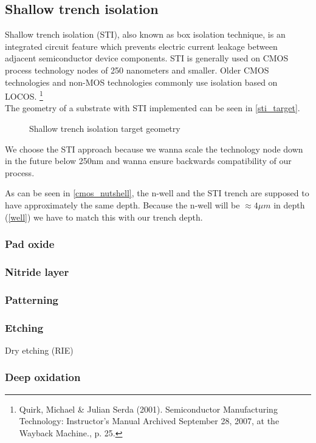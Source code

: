 \subsection{Shallow trench isolation}\label{sti}
Shallow trench isolation (STI), also known as box isolation technique, is an integrated circuit feature which prevents electric current leakage between adjacent semiconductor device components.
STI is generally used on CMOS process technology nodes of 250 nanometers and smaller.
Older CMOS technologies and non-MOS technologies commonly use isolation based on LOCOS.
\footnote{Quirk, Michael \& Julian Serda (2001). Semiconductor Manufacturing Technology: Instructor's Manual Archived September 28, 2007, at the Wayback Machine., p. 25.} \\
The geometry of a substrate with STI implemented can be seen in \autoref{sti_target}.

\begin{figure}[H]
	\centering
	\begin{tikzpicture}[node distance = 3cm, auto, thick,scale=\CrossAndTopSectionBig, every node/.style={transform shape}]
		
	\end{tikzpicture}
	\begin{tikzpicture}[node distance = 3cm, auto, thick,scale=\CrossAndTopSectionBig, every node/.style={transform shape}]
		
	\end{tikzpicture}
	\caption{Shallow trench isolation target geometry}
	\label{sti_target}
\end{figure}

We choose the STI approach because we wanna scale the technology node down in the future below 250nm and wanna ensure backwards compatibility of our process.

As can be seen in \autoref{cmos_nutshell}, the n-well and the STI trench are supposed to have approximately the same depth.
Because the n-well will be $\approx 4 \mu m$ in depth (\autoref{well}) we have to match this with our trench depth.

\subsubsection{Pad oxide}
\subsubsection{Nitride layer}
\subsubsection{Patterning}
\subsubsection{Etching}
Dry etching (RIE)
\subsubsection{Deep oxidation}
